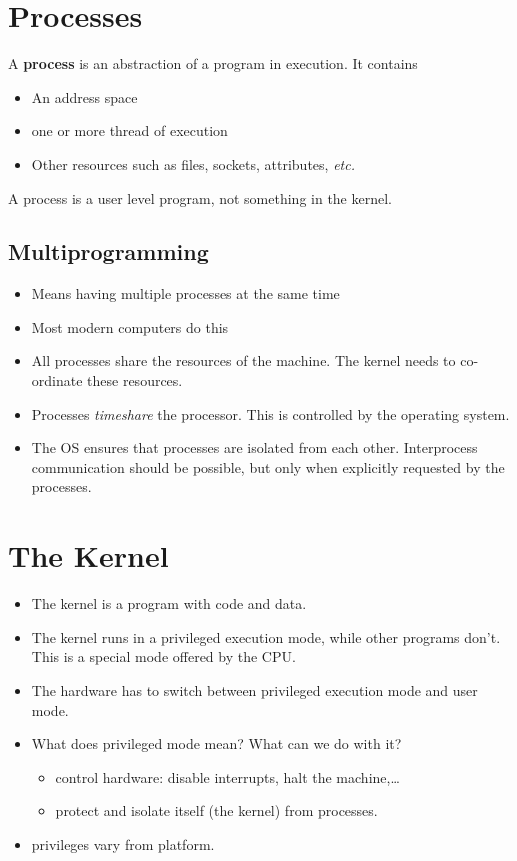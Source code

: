 \documentclass[12pt]{article}
\begin{document}
\section{Processes}

A \textbf{process} is an abstraction of a program in execution. It contains
\begin{itemize}
    \item An address space
    \item one or more thread of execution
    \item Other resources such as files, sockets, attributes, \textit{etc.}
\end{itemize}

A process is a user level program, not something in the kernel.

\subsection{Multiprogramming}

\begin{itemize}
    \item Means having multiple processes at the same time
    \item Most modern computers do this
    \item All processes share the resources of the machine.  The kernel needs to
        co-ordinate these resources.
    \item Processes \emph{timeshare} the processor. This is controlled by the
        operating system.
    \item The OS ensures that processes are isolated from each other.
        Interprocess communication should be possible, but only when explicitly
        requested by the processes.
\end{itemize}

\section{The Kernel}

\begin{itemize}
    \item The kernel is a program with code and data.
    \item The kernel runs in a privileged execution mode, while other programs
        don't. This is a special mode offered by the CPU.
    \item The hardware has to switch between privileged execution mode and user
        mode.
    \item What does privileged mode mean? What can we do with it?
        \begin{itemize}
            \item control hardware: disable interrupts, halt the machine,\dots
            \item protect and isolate itself (the kernel) from processes.
        \end{itemize}
    \item privileges vary from platform.
\end{itemize}
\end{document}

